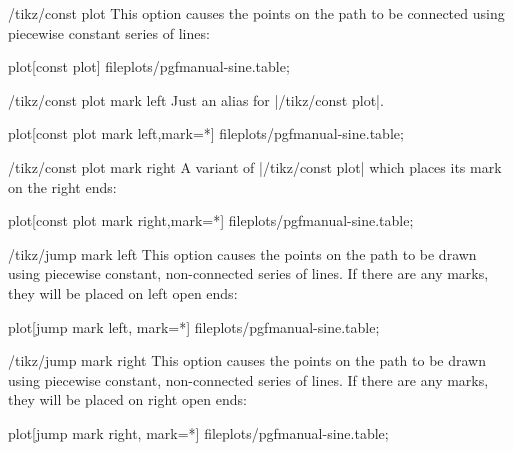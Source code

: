 \begin{key}{/tikz/const plot}
  This option causes the points on the path to be connected using piecewise constant series of lines:

\begin{codeexample}[]
\tikz\draw plot[const plot] file{plots/pgfmanual-sine.table};
\end{codeexample}
\end{key}

\begin{key}{/tikz/const plot mark left}
  Just an alias for |/tikz/const plot|.
\begin{codeexample}[]
\tikz\draw plot[const plot mark left,mark=*] file{plots/pgfmanual-sine.table};
\end{codeexample}
\end{key}

\begin{key}{/tikz/const plot mark right}
  A variant of |/tikz/const plot| which places its mark on the right ends:
\begin{codeexample}[]
\tikz\draw plot[const plot mark right,mark=*] file{plots/pgfmanual-sine.table};
\end{codeexample}
\end{key}


\begin{key}{/tikz/jump mark left}
  This option causes the points on the path to be drawn using piecewise constant, non-connected series of lines. If there are any marks, they will be placed on left open ends:

\begin{codeexample}[]
\tikz\draw plot[jump mark left, mark=*] file{plots/pgfmanual-sine.table};
\end{codeexample}
\end{key}

\begin{key}{/tikz/jump mark right}
  This option causes the points on the path to be drawn using piecewise constant, non-connected series of lines. If there are any marks, they will be placed on right open ends:

\begin{codeexample}[]
\tikz\draw plot[jump mark right, mark=*] file{plots/pgfmanual-sine.table};
\end{codeexample}
\end{key}

